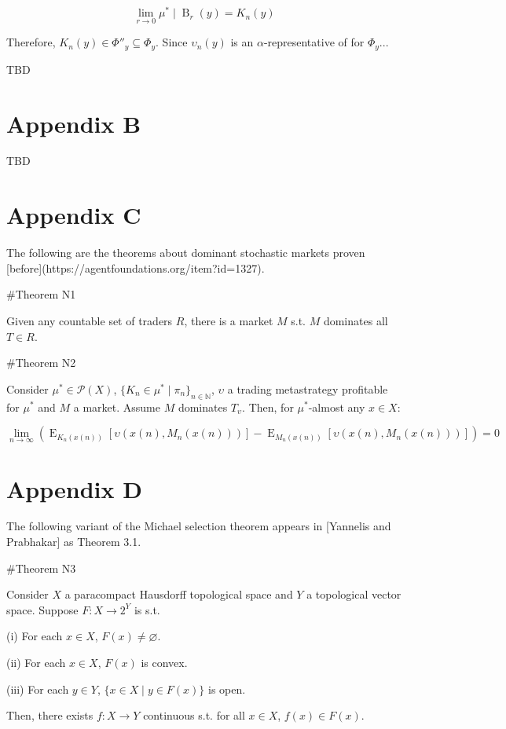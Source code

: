 \documentclass[a4paper]{article}
\newcommand{\Comment}[1]{}
\DeclareMathOperator{\E}{E}
\newcommand{\Nats}{\mathbb{N}}
\newcommand{\Prob}{\mathcal{P}}
\newcommand{\Ball}{\operatorname{B}}
\begin{document}
$$\lim_{r \rightarrow 0} \mu^* \mid \Ball_r(y) = K_n(y)$$


Therefore, ${K_n(y) \in \Phi''_y \subseteq \Phi_y}$. Since $\upsilon_n(y)$ is an $\alpha$-representative of for $\Phi_y$...

TBD

\section{Appendix B}

TBD

\section{Appendix C}

The following are the theorems about dominant stochastic markets proven [before](https://agentfoundations.org/item?id=1327).

\#Theorem N1

Given any countable set of traders $R$, there is a market ${M}$ s.t. ${M}$ dominates all ${T \in R}$.

\#Theorem N2

Consider ${\mu^* \in \Prob(X)}$, ${\{K_n \in \mu^* \mid \pi_{n}\}_{n \in \Nats}}$, ${\upsilon}$ a trading metastrategy profitable for ${\mu^*}$ and ${M}$ a market. Assume ${M}$ dominates ${T_\upsilon}$. Then, for ${\mu^*}$-almost any ${x \in X}$:

$$\lim_{n \rightarrow \infty} (\E_{K_n(x(n))}[\upsilon(x(n),M_n(x(n)))]-\E_{M_n(x(n))}[\upsilon(x(n),M_n(x(n)))])= 0$$

\section{Appendix D}

The following variant of the Michael selection theorem appears in [Yannelis and Prabhakar]\Comment{(https://www.biz.uiowa.edu/faculty/nyannelis/publications/Existence_of_Maximal_Elements_and_Equilibria_in_Linear_Topological_Spaces.pdf)} as Theorem 3.1.

\#Theorem N3

Consider $X$ a paracompact Hausdorff topological space and $Y$ a topological vector space. Suppose $F: X \rightarrow 2^Y$ is s.t.

(i) For each $x \in X$, $F(x) \ne \varnothing$.

(ii) For each $x \in X$, $F(x)$ is convex.

(iii) For each $y \in Y$, $\{x \in X \mid y \in F(x)\}$ is open.

Then, there exists $f: X \rightarrow Y$ continuous s.t. for all $x \in X$, $f(x) \in F(x)$.
\end{document}
